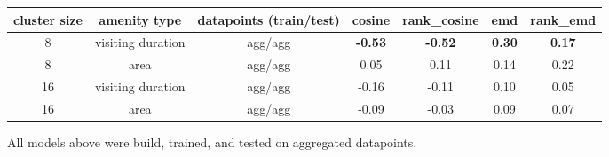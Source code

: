 \documentclass{ws-ijait}
\begin{document}
		\begin{table}[!ht]
			{\begin{tabular}{ | c | c | c | c | c | c | c | }
					\hline
					{cluster size} 	& {amenity type} 	& datapoints (train/test) 	& cosine 	& rank\_cosine & emd & rank\_emd \\ \hline
					8 				& {visiting duration} 		& agg/agg 		& \textbf{-0.53}	& \textbf{-0.52}		&	\textbf{0.30}	&	\textbf{0.17} \\ \hline
					8 				& area 				& agg/agg 		& 0.05	&	0.11	&	0.14	&	0.22 \\ \hline \hline
					16 				& {visiting duration} 		& agg/agg 		& -0.16	&	-0.11	&	0.10	&	0.05 \\ \hline
					16 				& area 				& agg/agg 		& -0.09	&	-0.03	&	0.09	&	0.07 \\ \hline
			\end{tabular}}
			\begin{tabnote}
				All models above were build, trained, and tested on aggregated datapoints.  
			\end{tabnote}
			\label{tab:correlation_amenity_area}
		\end{table}
								
\end{document}
